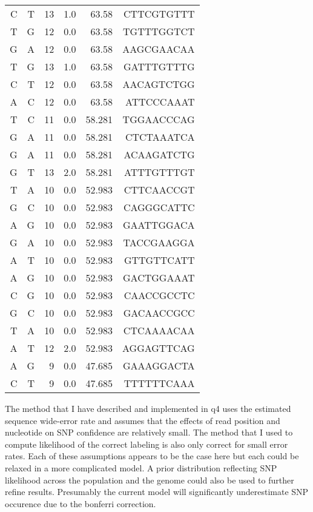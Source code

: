 \documentclass[12pt,draft,a4paper]{article}
\begin{document}
\begin{center}
\begin{tiny}
\begin{tabular}{rrrrrr}
C & T & 13 & 1.0 & 63.58 & CTTCGTGTTT\\
T & G & 12 & 0.0 & 63.58 & TGTTTGGTCT\\
G & A & 12 & 0.0 & 63.58 & AAGCGAACAA\\
T & G & 13 & 1.0 & 63.58 & GATTTGTTTG\\
C & T & 12 & 0.0 & 63.58 & AACAGTCTGG\\
A & C & 12 & 0.0 & 63.58 & ATTCCCAAAT\\
T & C & 11 & 0.0 & 58.281 & TGGAACCCAG\\
G & A & 11 & 0.0 & 58.281 & CTCTAAATCA\\
G & A & 11 & 0.0 & 58.281 & ACAAGATCTG\\
G & T & 13 & 2.0 & 58.281 & ATTTGTTTGT\\
T & A & 10 & 0.0 & 52.983 & CTTCAACCGT\\
G & C & 10 & 0.0 & 52.983 & CAGGGCATTC\\
A & G & 10 & 0.0 & 52.983 & GAATTGGACA\\
G & A & 10 & 0.0 & 52.983 & TACCGAAGGA\\
A & T & 10 & 0.0 & 52.983 & GTTGTTCATT\\
A & G & 10 & 0.0 & 52.983 & GACTGGAAAT\\
C & G & 10 & 0.0 & 52.983 & CAACCGCCTC\\
G & C & 10 & 0.0 & 52.983 & GACAACCGCC\\
T & A & 10 & 0.0 & 52.983 & CTCAAAACAA\\
A & T & 12 & 2.0 & 52.983 & AGGAGTTCAG\\
A & G & 9 & 0.0 & 47.685 & GAAAGGACTA\\
C & T & 9 & 0.0 & 47.685 & TTTTTTCAAA\\
\end{tabular}
\end{tiny}
\end{center}
The method that I have described and implemented in q4 uses the estimated sequence wide-error rate and assumes that the effects of read position and nucleotide on SNP confidence are relatively small. The method that I used to compute likelihood of the correct labeling is also only correct for small error rates. Each of these assumptions appears to be the case here but each could be relaxed in a more complicated model. A prior distribution reflecting SNP likelihood across the population and the genome could also be used to further refine results. Presumably the current model will significantly underestimate SNP occurence due to the bonferri correction. 
\end{document}
